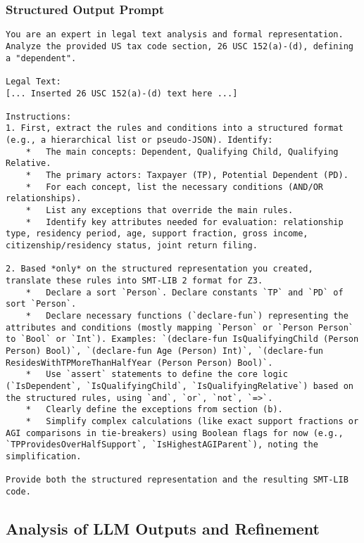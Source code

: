 \documentclass[11pt, letterpaper]{article}
\begin{document}
\subsubsection{Structured Output Prompt}
\begin{lstlisting}[style=promptstyle, caption={Structured Output Prompt used for initial SMT generation}]
You are an expert in legal text analysis and formal representation. Analyze the provided US tax code section, 26 USC 152(a)-(d), defining a "dependent".

Legal Text:
[... Inserted 26 USC 152(a)-(d) text here ...]

Instructions:
1. First, extract the rules and conditions into a structured format (e.g., a hierarchical list or pseudo-JSON). Identify:
    *   The main concepts: Dependent, Qualifying Child, Qualifying Relative.
    *   The primary actors: Taxpayer (TP), Potential Dependent (PD).
    *   For each concept, list the necessary conditions (AND/OR relationships).
    *   List any exceptions that override the main rules.
    *   Identify key attributes needed for evaluation: relationship type, residency period, age, support fraction, gross income, citizenship/residency status, joint return filing.

2. Based *only* on the structured representation you created, translate these rules into SMT-LIB 2 format for Z3.
    *   Declare a sort `Person`. Declare constants `TP` and `PD` of sort `Person`.
    *   Declare necessary functions (`declare-fun`) representing the attributes and conditions (mostly mapping `Person` or `Person Person` to `Bool` or `Int`). Examples: `(declare-fun IsQualifyingChild (Person Person) Bool)`, `(declare-fun Age (Person) Int)`, `(declare-fun ResidesWithTPMoreThanHalfYear (Person Person) Bool)`.
    *   Use `assert` statements to define the core logic (`IsDependent`, `IsQualifyingChild`, `IsQualifyingRelative`) based on the structured rules, using `and`, `or`, `not`, `=>`.
    *   Clearly define the exceptions from section (b).
    *   Simplify complex calculations (like exact support fractions or AGI comparisons in tie-breakers) using Boolean flags for now (e.g., `TPProvidesOverHalfSupport`, `IsHighestAGIParent`), noting the simplification.

Provide both the structured representation and the resulting SMT-LIB code.
\end{lstlisting}

\subsection{Analysis of LLM Outputs and Refinement}
\end{document}
